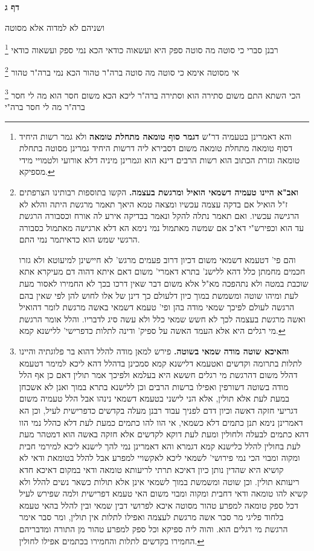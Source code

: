 \documentclass[12pt, openany]{book}
\newcommand{\sethebfont}{
\fontsize{10.5pt}{21.0pt} \selectfont
}
\newcommand{\twocol}[1]{
	{\sethebfont \begin{multicols}{2}
			#1
	\end{multicols}}	
}
\newcommand{\sectname}{}
\newcommand{\newsection}[1]{
	\addcontentsline{toc}{section}{#1}
	\renewcommand{\sectname}{#1}	
	\vspace{-\baselineskip}
	\begin{center}
		\textbf{%
\fontsize{16pt}{16pt}\selectfont
			#1}
	\end{center}
	\vspace{-\baselineskip}
	\nopagebreak
}
\newcommand{\footnotecomment}[1]{
	\renewcommand\thefootnote{}
	\footnote{#1}}
\newcommand{\commenta}[1]{\footnotecomment{#1}}
\begin{document}
\newsection{דף ג}
\twocol{ושניהם לא למדוה אלא מסוטה 
\commenta{והא דאמרינן בטעמיה דר"ש \textbf{דגמר סוף טומאה מתחלת טומאה} ולא גמר רשות היחיד דסוף טומאה מתחלת טומאה משום דסבירא ליה דרשות היחיד גמרינן מסוטה בתחלת טומאה וגזרת הכתוב הוא רשות הרבים דינא הוא וגמרינן מיניה דלא אורועי ולטמויי מידי מספיקא. }
רבנן סברי כי סוטה מה סוטה ספק היא ועשאוה כודאי הכא נמי ספק ועשאוה כודאי 
\commenta{\textbf{ואב"א היינו טעמיה דשמאי הואיל ומרגשת בעצמה.} הקשו בתוספות רבותינו הצרפתים ז"ל הואיל אם בדקה עצמה עכשיו ומצאה טמא היאך תאמר מרגשת היתה והלא לא הרגישה עכשיו. ואם תאמר נתלה להקל ונאמר בבדיקה אירע לה אורח וכסבורה הרגשת עד הוא וכפירש"י דא"כ אם שמשה מאתמול נמי נימא הא דלא ארגישה מאתמול כסבורה הרגשי שמש הוא כדאיתמר נמי התם.\par והם פי' דטעמא דשמאי משום דכיון דרוב פעמים מרגש' לא חיישינן למיעוטא ולא גזרו חכמים מחמתן כלל דהא ללישנ' בתרא דאמרי' משום דאם איתא דהוה דם מעיקרא אתא שוכבת במטה ולא נתהפכה מא"ל אלא משום דבר שאין דרכו בכך לא החמירו לאסור מעת לעת ומיהו שוטה ומשמשת במוך כיון דלעולם כך דינן של אלו לחוש להן לפי שאין בהם הרגשה לעולם לפיכך שמאי מודה בהן ופי' טעמא דשמאי באשה מרגשת לומר דהואיל ואשה מרגשת בעצמה לכך לא חשש שמאי כלל ולא עשה סיג לדבריו. והלל אומר הרגשת מי רגלים היא אלא העמד האשה על ספיק' ודינה לתלות כדפרישי' ללישנא קמא. }
אי מסוטה אימא כי סוטה מה סוטה ברה"ר טהור הכא נמי ברה"ר טהור 
\commenta{\textbf{והאיכא שוטה מודה שמאי בשוטה.} פירש למאן מודה להלל דהוא בר פלוגתיה והיינו לתלות בתרומה וקדשים ואטעמא דלישנא קמא סמכינן בדהלל דהא ליכא למימר דטעמא דהלל משום דהרגשת מי רגלים חששא היא בעלמא ולפיכך אמר תולין דאם כן אף הלל מודה בשוטה דשורפין ואפילו ברשות הרבים וכן ללישנא בתרא במוך ואנן לא אשכחן במעת לעת אלא תולין, אלא הני לישני בטעמא דשמאי נינהו אבל הלל טעמיה משום דגריעי חזקה דאשה וכיון דדם לפניך עבוד רבנן מעלה בקדשים כדפרישית לעיל, וכן הא דאמרינן נימא תנן כתמים דלא כשמאי, אי הוו להו כתמים כמעת לעת דלא כהלל נמי הוו דהא כתמים לבעלה ולחולין ומעת לעת דוקא לקדשים אלא חזקה באשה הוא דמטהר מעת לעת בחולין להלל כלישנא קמא דגמרא והא דאמרינן נמי להך לישנא ליכא למירמי חבית ומקוה ומבוי הכי נמי פירושי' לשמאי ליכא לאקשויי למפרע אבל להלל בטומאת ודאי לא קושיא היא שהדין נותן כיון דאיכא תרתי לריעותא טומאה ודאי במקום דאיכא חדא ריעותא תולין. וכן שוטה ומשמשת במוך לשמאי אינן אלא תולות כשאר נשים להלל ולא קשיא להו טומאה ודאי דחבית ומקוה ומבוי משום האי טעמא דפרישית ולמה שפירש לעיל דכל ספק טומאה למפרע טהור מסוטה איכא לפרושי דבין שמאי ובין להלל בהאי טעמא בלחוד פליגי מר סבר אשה מרגשת לעצמה ואפילו לתלות אין תולין, ומר סבר אימר הרגשת מי רגלים הוא. והוה ליה ספיקא וכל ספק למפרע טהור מן התורה ומדבריהם החמירו בקדשים לתלות והחמירו בכתמים אפילו לחולין. }
הכי השתא התם משום סתירה הוא וסתירה ברה"ר ליכא הכא משום חסר הוא מה לי חסר ברה"ר מה לי חסר ברה"י 
}
\end{document}
